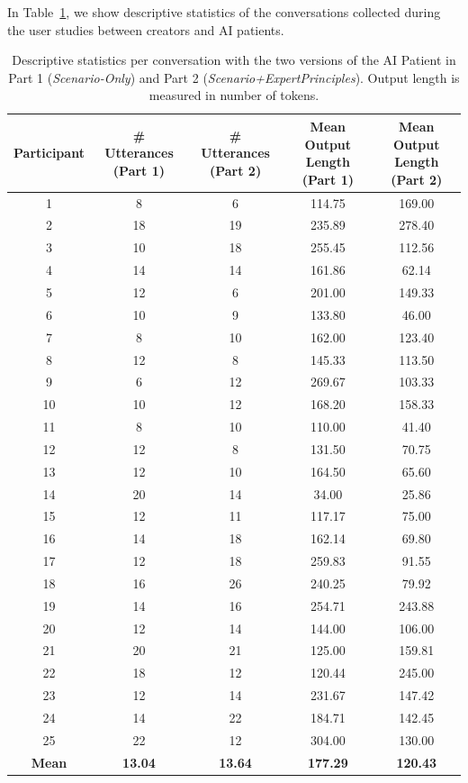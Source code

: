 \documentclass[11pt]{article}
\begin{document}
In Table~\ref{tab:descriptivestats-convos}, we show descriptive statistics of the conversations collected during the user studies between creators and AI patients.
\begin{table}[t]
\small
\centering
\begin{tabular}{|c|c|c|c|c|}
\hline
{\textbf{Participant}} & 
{\textbf{\# Utterances (Part 1)}} & 
{\textbf{\# Utterances (Part 2)}} & 
{\textbf{Mean Output Length (Part 1)}} & 
{\textbf{Mean Output Length (Part 2)}} \\
\hline
1  &  8 &  6 & 114.75  & 169.00  \\ \hline
2  & 18 & 19 & 235.89  & 278.40  \\ \hline
3  & 10 & 18 & 255.45  & 112.56  \\ \hline
4  & 14 & 14 & 161.86  & 62.14   \\ \hline
5  & 12 &  6 & 201.00  & 149.33  \\ \hline
6  & 10 &  9 & 133.80  & 46.00   \\ \hline
7  &  8 & 10 & 162.00  & 123.40  \\ \hline
8  & 12 &  8 & 145.33  & 113.50  \\ \hline
9  &  6 & 12 & 269.67  & 103.33  \\ \hline
10 & 10 & 12 & 168.20  & 158.33  \\ \hline
11 &  8 & 10 & 110.00  &  41.40  \\ \hline
12 & 12 &  8 & 131.50  &  70.75  \\ \hline
13 & 12 & 10 & 164.50  &  65.60  \\ \hline
14 & 20 & 14 &  34.00  &  25.86  \\ \hline
15 & 12 & 11 & 117.17  &  75.00  \\ \hline
16 & 14 & 18 & 162.14  &  69.80  \\ \hline
17 & 12 & 18 & 259.83  &  91.55  \\ \hline
18  & 16 & 26 & 240.25 & 79.92 \\ \hline
19  & 14 & 16 & 254.71 & 243.88\\ \hline
20  & 12 & 14 & 144.00 & 106.00\\ \hline
21   & 20 & 21 & 125.00 & 159.81\\ \hline
22  & 18 & 12 & 120.44 & 245.00 \\ \hline
23  & 12 & 14 & 231.67 & 147.42\\ \hline
24  & 14 & 22 & 184.71 & 142.45\\ \hline
25  & 22 & 12 & 304.00 & 130.00\\ \hline
\textbf{Mean} & \textbf{13.04} & \textbf{13.64} & \textbf{177.29} & \textbf{120.43} \\
\hline
\end{tabular}
\caption{Descriptive statistics per conversation with the two versions of the AI Patient in Part 1 (\textit{Scenario-Only}) and Part 2 (\textit{Scenario+ExpertPrinciples}). Output length is measured in number of tokens.}
\label{tab:descriptivestats-convos}
\end{table}
\end{document}
